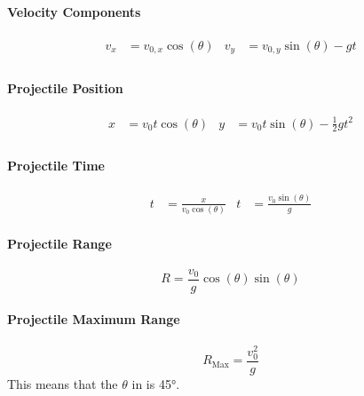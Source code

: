 \paragraph{Velocity Components} \label{par:Projectile Velocity Components}
\begin{equation} \label{eq:Projectile Velocity Components}
  \begin{aligned}
    v_{x} &= v_{0,x} \cos ( \theta ) & v_{y} &= v_{0,y} \sin ( \theta ) -gt \\
  \end{aligned}
\end{equation}

\paragraph{Projectile Position} \label{par:Projectile Position}
\begin{equation} \label{eq:Projectile Position}
  \begin{aligned}
    x &= v_{0} t \cos ( \theta ) & y &= v_{0} t \sin ( \theta ) - \frac{1}{2} gt^{2} \\
  \end{aligned}
\end{equation}

\paragraph{Projectile Time} \label{par:Projectile Time}
\begin{equation} \label{eq:Projectile Time}
  \begin{aligned}
    t &= \frac{x}{v_{0} \cos ( \theta )} & t &= \frac{v_{0} \sin ( \theta )}{g}
  \end{aligned}
\end{equation}

\paragraph{Projectile Range} \label{par:Projectile Range}
\begin{equation} \label{eq:Projectile Range}
  R = \frac{v_{0}}{g} \cos ( \theta ) \sin ( \theta )
\end{equation}

\paragraph{Projectile Maximum Range} \label{par:Projectile Maximum Range}
\begin{equation} \label{eq:Projectile Maximum Range}
  R_{\text{Max}} = \frac{v_{0}^{2}}{g}
\end{equation}
This means that the $\theta$ in  is \ang{45}.

